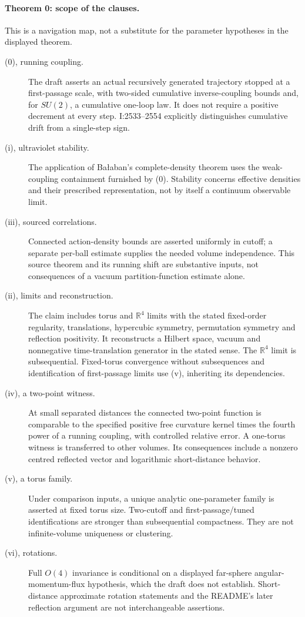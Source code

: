 \paragraph{Theorem 0: scope of the clauses.}
This is a navigation map, not a substitute for the
parameter hypotheses in the displayed theorem.
\begin{description}
\item[(0), running coupling.]
The draft asserts an actual recursively generated trajectory
stopped at a first-passage scale, with two-sided cumulative
inverse-coupling bounds and, for \(SU(2)\), a cumulative
one-loop law. It does not require a positive decrement at
every step. I:2533--2554 explicitly distinguishes cumulative
drift from a single-step sign.
\item[(i), ultraviolet stability.]
The application of Ba{\l}aban's complete-density theorem
uses the weak-coupling containment furnished by (0).
Stability concerns effective densities and their prescribed
representation, not by itself a continuum observable limit.
\item[(iii), sourced correlations.]
Connected action-density bounds are asserted uniformly in
cutoff; a separate per-ball estimate supplies the needed
volume independence. This source theorem and its running
shift are substantive inputs, not consequences of a vacuum
partition-function estimate alone.
\item[(ii), limits and reconstruction.]
The claim includes torus and \(\mathbb R^4\) limits with
the stated fixed-order regularity, translations, hypercubic
symmetry, permutation symmetry and reflection positivity.
It reconstructs a Hilbert space, vacuum and nonnegative
time-translation generator in the stated sense.
The \(\mathbb R^4\) limit is subsequential. Fixed-torus
convergence without subsequences and identification of
first-passage limits use (v), inheriting its dependencies.
\item[(iv), a two-point witness.]
At small separated distances the connected two-point
function is comparable to the specified positive free
curvature kernel times the fourth power of a running
coupling, with controlled relative error. A one-torus
witness is transferred to other volumes. Its consequences
include a nonzero centred reflected vector and logarithmic
short-distance behavior.
\item[(v), a torus family.]
Under comparison inputs, a unique analytic one-parameter
family is asserted at fixed torus size. Two-cutoff and
first-passage/tuned identifications are stronger than
subsequential compactness. They are not infinite-volume
uniqueness or clustering.
\item[(vi), rotations.]
Full \(O(4)\) invariance is conditional on a displayed
far-sphere angular-momentum-flux hypothesis, which the
draft does not establish. Short-distance approximate
rotation statements and the README's later reflection
argument are not interchangeable assertions.
\end{description}


